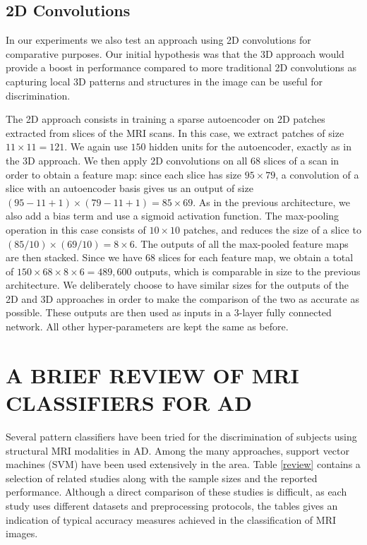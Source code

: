 \documentclass[a4paper,10pt]{article}
\begin{document}
\subsection{2D Convolutions}

\noindent In our experiments we also test an approach using 2D convolutions for comparative purposes. Our initial hypothesis was that the 3D approach would provide a boost in performance compared to more traditional 2D convolutions as capturing local 3D patterns and structures in the image can be useful for discrimination. 

The 2D approach consists in training a sparse autoencoder on 2D patches extracted from slices of the MRI scans. In this case, we extract patches of size $11\times11=121$. We again use $150$ hidden units for the autoencoder, exactly as in the 3D approach. We then apply 2D convolutions on all $68$ slices of a scan in order to obtain a feature map: since each slice has size $95\times79$, a convolution of a slice with an autoencoder basis gives us an output of size $(95-11+1)\times(79-11+1)=85\times69$. As in the previous architecture, we also add a bias term and use a sigmoid activation function. The max-pooling operation in this case consists of  $10\times10$ patches, and reduces the size of a slice to $(85/10)\times(69/10)=8\times6$. The outputs of all the max-pooled feature maps are then stacked. Since we have $68$ slices for each feature map, we obtain a total of $150\times68\times8\times6 = 489,600$ outputs, which is comparable in size to the previous architecture. We deliberately choose to have similar sizes for the outputs of the 2D and 3D approaches in order to make the comparison of the two as accurate as possible. These outputs are then used as inputs in a 3-layer fully connected network. All other hyper-parameters are kept the same as before. 

\section{\uppercase{A brief review of MRI classifiers for AD}}
\label{sec:review}

\noindent Several pattern classifiers have been tried for the discrimination of subjects using structural MRI modalities in AD. Among the many approaches, support vector machines (SVM) have been used extensively in the area. Table \ref{review} contains a selection of related studies along with the sample sizes and the reported performance. Although a direct comparison of these studies is difficult, as each study uses different datasets and preprocessing protocols, the tables gives an indication of typical accuracy measures achieved in the classification of MRI images.
\end{document}
